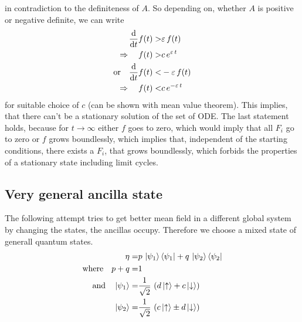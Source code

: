 \documentclass{article}
\begin{document}
in contradiction to the definiteness of $A$. So depending on, whether $A$ is positive or negative definite, we can write
\begin{align*}
    \frac{\text{d}}{\text{d}t} f(t) >& \varepsilon\,f(t)\\
    \Rightarrow\quad f(t) >& c\,e^{\varepsilon\,t}\\
    \text{or}\quad \frac{\text{d}}{\text{d}t} f(t) <& -\varepsilon\,f(t)\\
    \Rightarrow\quad f(t) <& c\,e^{-\varepsilon\,t}\\
\end{align*}
for suitable choice of $c$ (can be shown with mean value theorem). This implies, that there can't be a stationary solution of the set of ODE. The last statement holds, because for $t\rightarrow\infty$ either $f$ goes to zero, which would imply that all $F_i$ go to zero or $f$ grows boundlessly, which implies that, independent of the starting conditions, there exists a $F_i$, that grows boundlessly, which forbids the properties of a stationary state including limit cycles.





\subsection*{Very general ancilla state}
The following attempt tries to get better mean field in a different global system by changing the states, the ancillas occupy. Therefore we choose a mixed state of generall quantum states.
\begin{align*}
    \eta =& p \, \ket{\psi_1}\bra{\psi_1}+ q \, \ket{\psi_2}\bra{\psi_2}\\
    \text{where}\quad p+q=&1\\
    \text{and}\quad \ket{\psi_{1}}=&\frac{1}{\sqrt{2}}\,\left(d\ket{\uparrow} + c\ket{\downarrow}\right)\\
    \ket{\psi_{2}}=&\frac{1}{\sqrt{2}}\,\left(c\ket{\uparrow} \pm d\ket{\downarrow}\right)
\end{align*}
\end{document}
